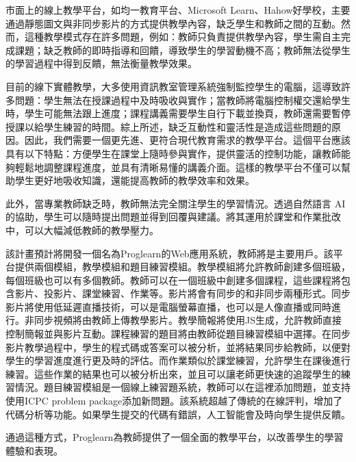 \documentclass[12pt]{article}
\begin{document}
\begin{enumerate}
    \par 市面上的線上教學平台，如均一教育平台、Microsoft Learn、Hahow好學校，主要通過靜態圖文與非同步影片的方式提供教學內容，缺乏學生和教師之間的互動。然而，這種教學模式存在許多問題，例如：教師只負責提供教學內容，學生需自主完成課題；缺乏教師的即時指導和回饋，導致學生的學習動機不高；教師無法從學生的學習過程中得到反饋，無法衡量教學效果\cite{ref4}。
    \par 目前的線下實體教學，大多使用資訊教室管理系統強制監控學生的電腦，這導致許多問題：學生無法在授課過程中及時吸收與實作；當教師將電腦控制權交還給學生時，學生可能無法跟上進度；課程講義需要學生自行下載並換頁，教師還需要暫停授課以給學生練習的時間。綜上所述，缺乏互動性和靈活性是造成這些問題的原因。因此，我們需要一個更先進、更符合現代教育需求的教學平台。這個平台應該具有以下特點：方便學生在課堂上隨時參與實作，提供靈活的控制功能，讓教師能夠輕鬆地調整課程進度，並具有清晰易懂的講義介面。這樣的教學平台不僅可以幫助學生更好地吸收知識，還能提高教師的教學效率和效果。
    \par 此外，當專業教師缺乏時，教師無法完全關注學生的學習情況。透過自然語言 AI 的協助，學生可以隨時提出問題並得到回覆與建議。將其運用於課堂和作業批改中，可以大幅減低教師的教學壓力。
    \par 該計畫預計將開發一個名為Proglearn的Web應用系統，教師將是主要用戶。該平台提供兩個模組，教學模組和題目練習模組。教學模組將允許教師創建多個班級，每個班級也可以有多個教師。教師可以在一個班級中創建多個課程，這些課程將包含影片、投影片、課堂練習、作業等。影片將會有同步的和非同步兩種形式。同步影片將使用低延遲直播技術，可以是電腦螢幕直播，也可以是人像直播或同時進行。非同步視頻將由教師上傳教學影片。教學簡報將使用JS生成，允許教師直接控制簡報並與影片互動。課程練習的題目將由教師從題目練習模組中選擇。在同步影片教學過程中，學生的程式碼或答案可以被分析，並將結果同步給教師，以便對學生的學習進度進行更及時的評估。而作業類似於課堂練習，允許學生在課後進行練習。這些作業的結果也可以被分析出來，並且可以讓老師更快速的追蹤學生的練習情況。題目練習模組是一個線上練習題系統，教師可以在這裡添加問題，並支持使用ICPC problem package添加新問題。該系統超越了傳統的在線評判，增加了代碼分析等功能。如果學生提交的代碼有錯誤，人工智能會及時向學生提供反饋。
    \par 通過這種方式，Proglearn為教師提供了一個全面的教學平台，以改善學生的學習體驗和表現。


\end{enumerate}
\end{document}

